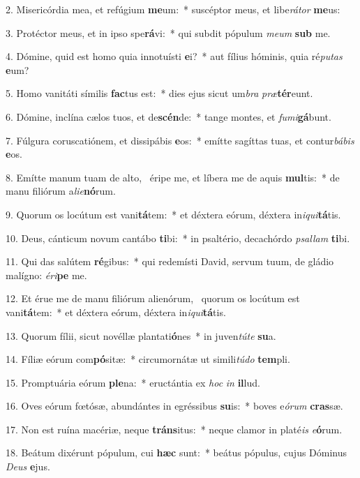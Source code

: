 2. Misericórdia mea, et refúgium \textbf{me}um:~*  suscéptor meus, et libe\textit{rá}\textit{tor} \textbf{me}us:\

3. Protéctor meus, et in ipso spe\textbf{rá}vi:~*  qui subdit pópulum \textit{me}\textit{um} \textbf{sub} me.\

4. Dómine, quid est homo quia innotuísti \textbf{e}i?~*  aut fílius hóminis, quia ré\textit{pu}\textit{tas} \textbf{e}um?\

5. Homo vanitáti símilis \textbf{fac}tus est:~*  dies ejus sicut um\textit{bra} \textit{præ}\textbf{tér}eunt.\

6. Dómine, inclína cælos tuos, et de\textbf{scén}de:~*  tange montes, et \textit{fu}\textit{mi}\textbf{gá}bunt.\

7. Fúlgura coruscatiónem, et dissipábis \textbf{e}os:~*  emítte sagíttas tuas, et contur\textit{bá}\textit{bis} \textbf{e}os.\

8. Emítte manum tuam de alto, \dag\  éripe me, et líbera me de aquis \textbf{mul}tis:~*  de manu filiórum a\textit{li}\textit{e}\textbf{nó}rum.\

9. Quorum os locútum est vani\textbf{tá}tem:~*  et déxtera eórum, déxtera in\textit{i}\textit{qui}\textbf{tá}tis.\

10. Deus, cánticum novum cantábo \textbf{ti}bi:~*  in psaltério, decachórdo \textit{psal}\textit{lam} \textbf{ti}bi.\

11. Qui das salútem \textbf{ré}gibus:~*  qui redemísti David, servum tuum, de gládio malígno: \textit{é}\textit{ri}\textbf{pe} me.\

12. Et érue me de manu filiórum alienórum, \dag\  quorum os locútum est vani\textbf{tá}tem:~*  et déxtera eórum, déxtera in\textit{i}\textit{qui}\textbf{tá}tis.\

13. Quorum fílii, sicut novéllæ plantati\textbf{ó}nes~*  in juven\textit{tú}\textit{te} \textbf{su}a.\

14. Fíliæ eórum com\textbf{pó}sitæ:~*  circumornátæ ut simili\textit{tú}\textit{do} \textbf{tem}pli.\

15. Promptuária eórum \textbf{ple}na:~*  eructántia ex \textit{hoc} \textit{in} \textbf{il}lud.\

16. Oves eórum fœtósæ, abundántes in egréssibus \textbf{su}is:~*  boves e\textit{ó}\textit{rum} \textbf{cras}sæ.\

17. Non est ruína macériæ, neque \textbf{tráns}itus:~*  neque clamor in platé\textit{is} \textit{e}\textbf{ó}rum.\

18. Beátum dixérunt pópulum, cui \textbf{hæc} sunt:~*  beátus pópulus, cujus Dóminus \textit{De}\textit{us} \textbf{e}jus.\

